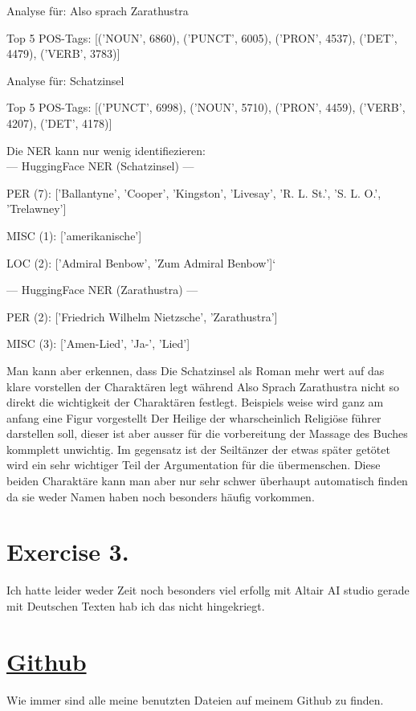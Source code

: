 \documentclass{scrartcl}
\begin{document}
Analyse für: Also sprach Zarathustra

Top 5 POS-Tags: [('NOUN', 6860), ('PUNCT', 6005), ('PRON', 4537), ('DET', 4479), ('VERB', 3783)]

Analyse für: Schatzinsel

Top 5 POS-Tags: [('PUNCT', 6998), ('NOUN', 5710), ('PRON', 4459), ('VERB', 4207), ('DET', 4178)]

Die NER kann nur wenig identifiezieren:\\
--- HuggingFace NER (Schatzinsel) ---

PER (7): ['Ballantyne', 'Cooper', 'Kingston', 'Livesay', 'R. L. St.', 'S. L. O.', 'Trelawney']

MISC (1): ['amerikanische']

LOC (2): ['Admiral Benbow', 'Zum Admiral Benbow']`

--- HuggingFace NER (Zarathustra) ---

PER (2): ['Friedrich Wilhelm Nietzsche', 'Zarathustra']

MISC (3): ['Amen-Lied', 'Ja-', 'Lied']

Man kann aber erkennen, dass Die Schatzinsel als Roman mehr wert auf das klare vorstellen der Charaktären legt während Also Sprach Zarathustra nicht so direkt die wichtigkeit der Charaktären festlegt. Beispiels weise wird ganz am anfang eine Figur vorgestellt Der Heilige der wharscheinlich Religiöse führer darstellen soll, dieser ist aber ausser für die vorbereitung der Massage des Buches kommplett unwichtig. Im gegensatz ist der Seiltänzer der etwas später getötet wird ein sehr wichtiger Teil der Argumentation für die übermenschen. Diese beiden Charaktäre kann man aber nur sehr schwer überhaupt automatisch finden da sie weder Namen haben noch besonders häufig vorkommen. 

\section*{Exercise 3.}
Ich hatte leider weder Zeit noch besonders viel erfollg mit Altair AI studio gerade mit Deutschen Texten hab ich das nicht hingekriegt.

\section*{\href{https://github.com/7hands/Angewandte-Modellierung-25-Colmant}{Github}}
Wie immer sind alle meine benutzten Dateien auf meinem Github zu finden. 
\end{document}

